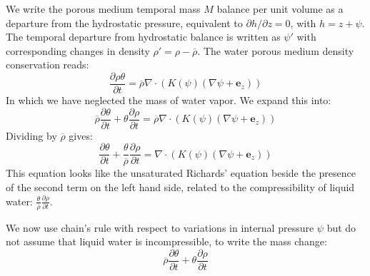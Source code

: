\documentclass{article}
\begin{document}
We write the porous medium temporal mass $M$ balance per unit volume as a departure from the hydrostatic pressure, equivalent to $\partial h/\partial z=0$, with $h=z+\psi$. The temporal departure from hydrostatic balance is written as $\psi'$ with corresponding changes in density $\rho'=\rho-\overline\rho$. The water porous medium density conservation reads:
\begin{equation}
\frac{\partial \rho \theta}{\partial t} = {\overline{\rho}} \nabla \cdot \left( K(\psi) \left( \nabla \psi + {\mathbf e_z} \right) \right)
\end{equation}
In which we have neglected the mass of water vapor.
We expand this into:
\begin{equation}
{\overline \rho} \frac{\partial \theta}{\partial t} + \theta \frac{\partial \rho}{\partial t} = {\overline \rho} \nabla \cdot \left( K(\psi) \left( \nabla \psi + {\mathbf e_z} \right) \right)
\end{equation}
Dividing by $\overline \rho$ gives:
\begin{equation}
\frac{\partial \theta}{\partial t} + \frac{\theta}{\overline \rho} \frac{\partial \rho}{\partial t} = \nabla \cdot \left( K(\psi) \left( \nabla \psi + {\mathbf e_z} \right) \right)
\end{equation}
This equation looks like the unsaturated Richards’ equation beside the presence of the second term on the left hand side, related to the compressibility of liquid water: $ \frac{\theta}{\overline \rho} \frac{\partial \rho}{\partial t}$.

We now use chain’s rule with respect to variations in internal pressure $\psi$ but do not assume that liquid water is incompressible, to write the mass change:
\begin{equation}
{\overline \rho} \frac{\partial \theta}{\partial t} + \theta \frac{\partial \rho}{\partial t} 
\end{equation}
\end{document}
